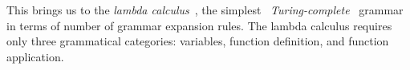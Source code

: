 \documentclass{article}
\begin{document}
This brings us to the \emph{lambda calculus}~\citep{lambdacalculus},
the simplest~\citep{selinger2008lecture}
\emph{Turing-complete}~\citep{turing1936computable} grammar
in terms of number of grammar expansion rules.
The lambda calculus requires only three grammatical categories:
variables, function definition, and function application.




\end{document}
